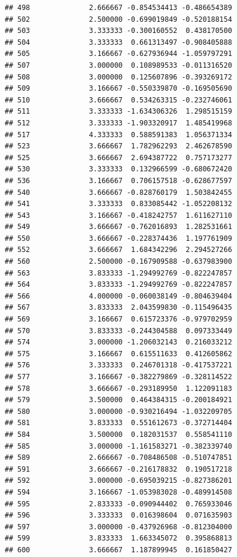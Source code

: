 \documentclass[
]{article}
\begin{document}
\begin{verbatim}
## 498              2.666667 -0.854534413 -0.486654389
## 502              2.500000 -0.699019849 -0.520188154
## 503              3.333333 -0.300160552  0.438170500
## 504              3.333333  0.661313497 -0.908405888
## 505              3.166667 -0.627936944 -1.059797291
## 507              3.000000  0.108989533 -0.011316520
## 508              3.000000  0.125607896 -0.393269172
## 509              3.166667 -0.550339870 -0.169505690
## 510              3.666667  0.534263315 -0.232746061
## 511              3.333333 -1.634306326  1.298515159
## 512              3.333333 -1.903320917  1.485419968
## 517              4.333333  0.588591383  1.056371334
## 523              3.666667  1.782962293  2.462678590
## 525              3.666667  2.694387722  0.757173277
## 530              3.333333  0.132966599 -0.680672420
## 536              3.166667  0.706157518 -0.628677597
## 540              3.666667 -0.828760179  1.503842455
## 541              3.333333  0.833085442 -1.052208132
## 543              3.166667 -0.418242757  1.611627110
## 549              3.666667 -0.762016893  1.282531661
## 550              3.666667 -0.228374436  1.197761909
## 552              3.666667  1.684342296  2.294527266
## 560              2.500000 -0.167909588 -0.637983900
## 563              3.833333 -1.294992769 -0.822247857
## 564              3.833333 -1.294992769 -0.822247857
## 566              4.000000 -0.060038149 -0.804639404
## 567              3.833333  2.043599830 -0.115496435
## 569              3.166667  0.615723376 -0.979702959
## 570              3.833333 -0.244304588  0.097333449
## 574              3.000000 -1.206032143  0.216033212
## 575              3.166667  0.615511633  0.412605862
## 576              3.333333  0.246701318 -0.417537221
## 577              3.166667 -0.382279869 -0.328114522
## 578              3.666667 -0.293189950  1.122091183
## 579              3.500000  0.464384315 -0.200184921
## 580              3.000000 -0.930216494 -1.032209705
## 581              3.833333  0.551612673 -0.372714404
## 584              3.500000  0.182031537  0.558541110
## 585              3.000000 -1.161583271 -0.382339740
## 589              2.666667 -0.708486508 -0.510747851
## 591              3.666667 -0.216178832  0.190517218
## 592              3.000000 -0.695039215 -0.827386201
## 594              3.166667 -1.053983028 -0.489914508
## 595              2.833333 -0.090944402  0.765933046
## 596              3.333333  0.016398604  0.071635903
## 597              3.000000 -0.437926968 -0.812304000
## 599              3.833333  1.663345072  0.395868813
## 600              3.666667  1.187899945  0.161850427

\end{verbatim}
\end{document}
